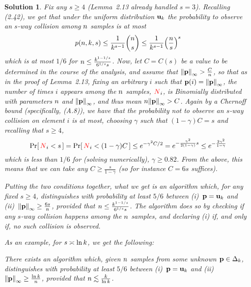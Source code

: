 \documentclass[biber]{nowfnt} %
\newtheorem{solution}{Solution}[chapter]
\newcommand{\occur}{\textcolor{red}{N}}
\newcommand{\occur}{N}
\begin{document}
\begin{solution}
Fix any $s\geq 4$ (Lemma~2.13 already handled $s=3$). Recalling (2.42), we get that under the uniform distribution $\mathbf{u}_{ k } $ the probability to observe an $s$-way collision among $n$ samples is at most
\[
	p(\ns,\ab,s) \leq \frac{1}{\ab^{s-1}}\binom{\ns}{s} \leq \frac{1}{\ab^{s-1}}\Paren{\frac{\ns}{s}}^s
\]
which is at most $1/6$ for $n \leq \frac{k^{1-1/s}}{6^{1/s}s}$. Now, let $C=C(s)$ be a value to be determined in the course of the analysis, and assume that $\norminf{\p}> \frac{C}{\ns}$, so that as in the proof of Lemma~2.13, fixing an arbitrary $i$ such that $\p(i) = \norminf{\p}$, the number of times $i$ appears among the $n$ samples, $\occur_i$, is Binomially distributed with parameters $n$ and $\norminf{\p}$, and thus mean $\ns\norminf{\p} > C$. Again by a Chernoff bound (specifically, (A.8)), we have that the probability \emph{not} to observe an $s$-way collision on element $i$ is at most, choosing $\gamma$ such that $(1-\gamma) C=s$ and recalling that $s \geq 4$,
\[
	\probaOf{\occur_i < s } = \probaOf{\occur_i < (1-\gamma) C } \leq e^{-\gamma^2 C/2} = e^{-\frac{\gamma^2}{2(1-\gamma)}s} \leq e^{-\frac{2\gamma^2}{1-\gamma}}
\]
which is less than $1/6$ for (solving numerically), \eg $\gamma \geq 0.82$. From the above, this means that we can take any $C \geq \frac{s}{1-\gamma}$ (so for instance $C = 6s$ suffices).

Putting the two conditions together, what we get is an algorithm which, for any fixed $s\geq 4$, distinguishes  with probability at least $5/6$ between (i)~$\mathbf{p}=\mathbf{u}_{ k } $ and (ii)~$\norminf{\p}\geq \frac{6s}{\ns}$, provided that $n \leq \frac{k^{1-1/s}}{6^{1/s}s}$. The algorithm does so by checking if any $s$-way collision happens among the $n$ samples, and declaring (i) if, and only if, no such collision is observed.\medskip

\noindent As an example, for $s \asymp\ln k$, we get the following:
\begin{corollary}
There exists an algorithm which, given $n$ \iid samples from some unknown $\mathbf{p}\in\Delta_{k}$,  distinguishes  with probability at least $5/6$  between (i)~$\mathbf{p}=\mathbf{u}_{ k } $ and (ii)~$\norminf{\p}\geq \frac{\ln \ab}{\ns}$, provided that $n \lesssim \frac{k}{\ln k}$. 
\end{corollary}
\end{solution}
\end{document}
